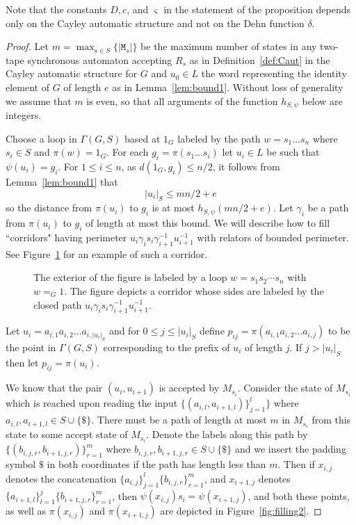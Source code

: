 \documentclass[11pt]{amsart}
\newcommand{\cC}{\varsigma}
\theoremstyle{definition}
\begin{document}
Note that the constants $D,c$, and $\cC$ in the statement of the proposition depends only on the Cayley automatic structure and not on the Dehn function $\delta$.


\begin{proof}
Let $m=\max_{s\in S}\{|\texttt{M}_s|\}$ be the maximum number of states in any two-tape synchronous automaton accepting $R_s$ as in Definition~\ref{def:Caut} in the Cayley automatic structure for $G$ and  $u_0\in L$  the word representing the identity element of $G$  of length $e$ as in Lemma~\ref{lem:bound1}.
Without loss of generality we assume that $m$ is
	even, so that all arguments of the function $h_{S,\psi}$
  below are integers.

Choose a loop in $\Gamma(G,S)$ based at $1_G$ labeled by the path $w=s_1\dots s_n$ where $s_i\in S$ and $\pi(w)=1_G$.  For each $g_i=\pi(s_1\dots s_i)$ let $u_i\in L$ be such that $\psi(u_i)=g_i$.
For $1\leq i\leq n$,
as $d(1_G,g_i)\leq n/2$, it follows from Lemma~\ref{lem:bound1}  that \begin{equation}\label{eq:lemma}
    |u_i|_S\leq m n/2+e
\end{equation} so the distance from $\pi(u_i)$ to $g_i$ is at most
$h_{S,\psi}(mn/2+e)$.
Let $\gamma_i$ be a path from $\pi(u_i)$ to $g_i$ of length at most this bound.
We will describe how to fill ``corridors" having perimeter $u_i\gamma_is_i\gamma_{i+1}^{-1}u_{i+1}^{-1}$ with relators of bounded perimeter.
See  Figure~\ref{fig:filling1} for an example of such a corridor.


 \begin{figure}[h!]

\caption{The exterior of the figure is labeled by a loop $w = s_1s_2 \cdots s_n$ with $w=_G1$.  The figure depicts a corridor whose sides are labeled by the closed path $u_i\gamma_is_i\gamma_{i+1}^{-1}u_{i+1}^{-1}$.}
\label{fig:filling1}
\end{figure}



Let $u_i=a_{i,1}a_{i,2}\dots a_{i,|u_i|_S}$ and for $0\leq j\leq |u_i|_S$ define $p_{ij}=\pi(a_{i,1}a_{i,2}\dots a_{i,j})$ to be the point in $\Gamma(G,S)$ corresponding to the prefix of $u_i$ of length $j$.
If $j>|u_i|_S$ then let $p_{ij}=\pi(u_i)$.

We know that the pair $(u_i,u_{i+1})$ is accepted by $M_{s_i}$.
Consider the state  of $M_{s_i}$ which is reached upon reading the input $\{(a_{i,l},a_{i+1,l})\}_{j=1}^l \}$
where $a_{i,l},a_{i+1,l}\in S\cup\{\$\}$.
There must be a path of length at most $m$ in $M_{s_i}$ from this state to some accept state of $M_{s_i}$.
Denote the labels along this path by $\{(b_{i,j,r},b_{i+1,j,r}) \}_{r=1}^m$ where
$b_{i,j,r},b_{i+1,j,r}\in S\cup\{\$\}$ and we insert the padding symbol $\$$ in both coordinates if the path has length less than $m$.
Then if $x_{i,j}$ denotes the concatenation
$\{a_{i,j}\}_{j=1}^l\{b_{i,j,r}\}_{r=1}^m$, and $x_{i+1,j}$ denotes
$\{a_{i+1,l}\}_{l=1}^j\{b_{i+1,j,r}\}_{r=1}^m$, then $\psi(x_{i,j})s_i = \psi(x_{i+1,j})$, and both these points, as well as $\pi(x_{i,j})$ and $\pi(x_{i+1,j})$ are depicted in Figure~\ref{fig:filling2}.


\end{proof}
\end{document}
